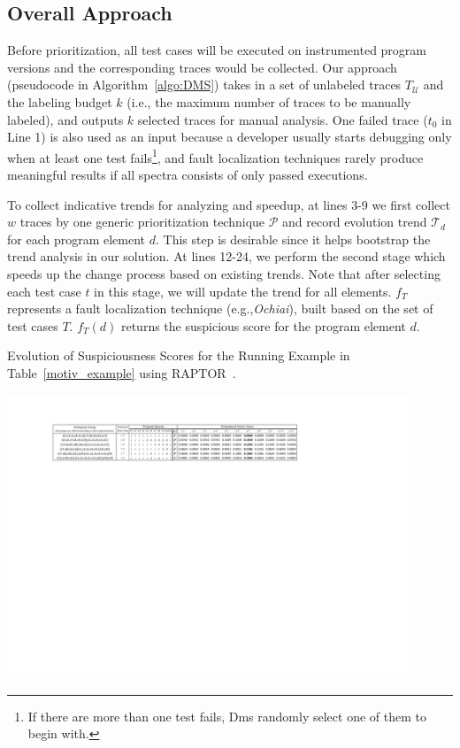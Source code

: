 \subsection{Overall Approach}

Before prioritization, all test cases will be executed on instrumented program versions and the corresponding traces would be collected.
Our approach (pseudocode in Algorithm~\ref{algo:DMS}) takes in a set of unlabeled traces $T_\mathcal{U}$ and the labeling budget $k$ (i.e., the maximum number of traces to be manually labeled), and outputs $k$ selected traces for manual analysis.
One failed trace ($t_{0}$ in Line 1) is also used as an input because a developer usually starts debugging only when at least one test fails\footnote{If there are more than one test fails, Dms randomly select one of them to begin with.}, and fault localization techniques rarely produce meaningful results if all spectra consists of only passed executions.

To collect indicative trends for analyzing and speedup, at lines 3-9 we first collect $w$ traces by one generic prioritization technique $\mathcal{P}$ and record evolution trend $\mathcal{T}_{d}$ for each program element $d$. This step is desirable since it helps bootstrap the trend analysis in our solution.
At lines 12-24, we perform the second stage which speeds up the change process based on existing trends. Note that after selecting each test case $t$ in this stage, we will update the trend for all elements. $f_{T}$ represents a fault localization technique (e.g.,{\em Ochiai}), built based on the set of test cases $T$. $f_{T}(d)$ returns the suspicious score for the program element $d$.


\begin{table}[!htbp]
    \centering
	\caption{Evolution of Suspiciousness Scores for the Running Example in Table~\ref{motiv_example} using RAPTOR~\citep{Alberto2011}.}
    \includegraphics[width=12cm]{ag_table.pdf}
    \label{tab:ag_evo}
\end{table}

